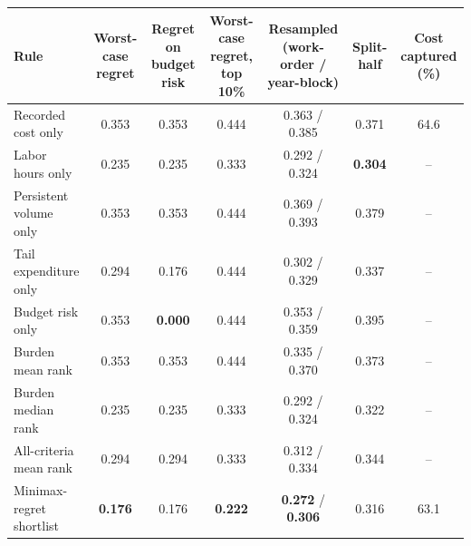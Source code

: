 \begin{tabular}{p{4.0cm}cccccc}
\toprule
Rule & Worst-case regret & Regret on budget risk & Worst-case regret, top 10\% & Resampled (work-order / year-block) & Split-half & Cost captured (\%) \\
\midrule
Recorded cost only & 0.353 & 0.353 & 0.444 & 0.363 / 0.385 & 0.371 & 64.6 \\
Labor hours only & 0.235 & 0.235 & 0.333 & 0.292 / 0.324 & \textbf{0.304} & -- \\
Persistent volume only & 0.353 & 0.353 & 0.444 & 0.369 / 0.393 & 0.379 & -- \\
Tail expenditure only & 0.294 & 0.176 & 0.444 & 0.302 / 0.329 & 0.337 & -- \\
Budget risk only & 0.353 & \textbf{0.000} & 0.444 & 0.353 / 0.359 & 0.395 & -- \\
Burden mean rank & 0.353 & 0.353 & 0.444 & 0.335 / 0.370 & 0.373 & -- \\
Burden median rank & 0.235 & 0.235 & 0.333 & 0.292 / 0.324 & 0.322 & -- \\
All-criteria mean rank & 0.294 & 0.294 & 0.333 & 0.312 / 0.334 & 0.344 & -- \\
Minimax-regret shortlist & \textbf{0.176} & 0.176 & \textbf{0.222} & \textbf{0.272} / \textbf{0.306} & 0.316 & 63.1 \\
\bottomrule
\end{tabular}

